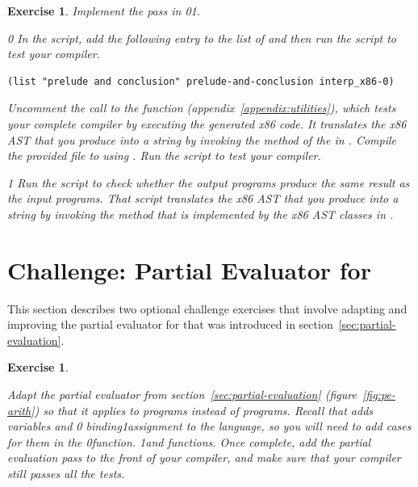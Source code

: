 \documentclass[7x10]{TimesAPriori_MIT}%
\def\racketEd{0}
\def\pythonEd{1}
\def\edition{1}
\newcommand{\racket}[1]{{\if\edition\racketEd{#1}\fi}}
\newcommand{\pythonColor}[0]{}
\newcommand{\python}[1]{{\if\edition\pythonEd\pythonColor #1\fi}}
\newtheorem{exercise}[theorem]{Exercise}
\numberwithin{theorem}{chapter}
\numberwithin{definition}{chapter}
\numberwithin{equation}{chapter}
\begin{document}
\begin{exercise}\normalfont\normalsize
%
Implement the  pass in
\racket{}\python{}.
%
{\if\edition\racketEd
In the  script, add the following entry to the
list of  and then run the script to test your compiler.
\begin{lstlisting}
(list "prelude and conclusion" prelude-and-conclusion interp_x86-0)
\end{lstlisting}
%  
Uncomment the call to the  function
(appendix~\ref{appendix:utilities}), which tests your complete
compiler by executing the generated x86 code. It translates the x86
AST that you produce into a string by invoking the 
method of the  in . Compile
the provided  file to  using
. Run the script to test your compiler.
%
\fi}
{\if\edition\pythonEd\pythonColor
%
Run the  script to check whether the output
programs produce the same result as the input programs. That script
translates the x86 AST that you produce into a string by invoking the
 method that is implemented by the x86 AST classes in
.
%
\fi}

\end{exercise}


\section{Challenge: Partial Evaluator for \LangVar{}}
\label{sec:pe-Lvar}

This section describes two optional challenge exercises that involve
adapting and improving the partial evaluator for \LangInt{} that was
introduced in section~\ref{sec:partial-evaluation}.

\begin{exercise}\label{ex:pe-Lvar}
\normalfont\normalsize
  
Adapt the partial evaluator from section~\ref{sec:partial-evaluation}
(figure~\ref{fig:pe-arith}) so that it applies to \LangVar{} programs
instead of \LangInt{} programs. Recall that \LangVar{} adds variables and
%
\racket{ binding}\python{assignment}
%
to the \LangInt{} language, so you will need to add cases for them in
the 
%
\racket{function.}
%
\python{and  functions.}
%
Once complete, add the partial evaluation pass to the front of your
compiler, and make sure that your compiler still passes all the
tests.
\end{exercise}
\end{document}
